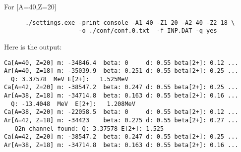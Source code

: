 \documentclass[preprint,review,12pt]{elsarticle}
\begin{document}
\begin{description}
        \subitem For [A=40,Z=20]
    \begin{verbatim}
      ./settings.exe -print console -A1 40 -Z1 20 -A2 40 -Z2 18 \
                     -o ./conf/conf.0.txt  -f INP.DAT -q yes
    \end{verbatim}  
Here is the output:     
\begin{verbatim}
Ca[A=40, Z=20] m: -34846.4  beta: 0     d: 0.55 beta[2+]: 0.12 ...
Ar[A=40, Z=18] m: -35039.9  beta: 0.251 d: 0.55 beta[2+]: 0.25 ...
  Q: 3.37578  MeV E[2+]:   1.525MeV
Ca[A=42, Z=20] m: -38547.2  beta: 0.247 d: 0.55 beta[2+]: 0.25 ...
Ar[A=38, Z=18] m: -34714.8  beta: 0.163 d: 0.55 beta[2+]: 0.16 ...
  Q: -13.4048  MeV  E[2+]:   1.208MeV
Ca[A=38, Z=20] m: -22058.5  beta: 0     d: 0.55 beta[2+]: 0.12 ...
Ar[A=42, Z=18] m: -34423    beta: 0.275 d: 0.55 beta[2+]: 0.27 ...
   Q2n channel found: Q: 3.37578 E[2+]: 1.525
Ca[A=42, Z=20] m: -38547.2  beta: 0.247 d: 0.55 beta[2+]: 0.25 ...
Ar[A=38, Z=18] m: -34714.8  beta: 0.163 d: 0.55 beta[2+]: 0.16 ...

    \end{verbatim}  
    \end{description}
\end{document}
